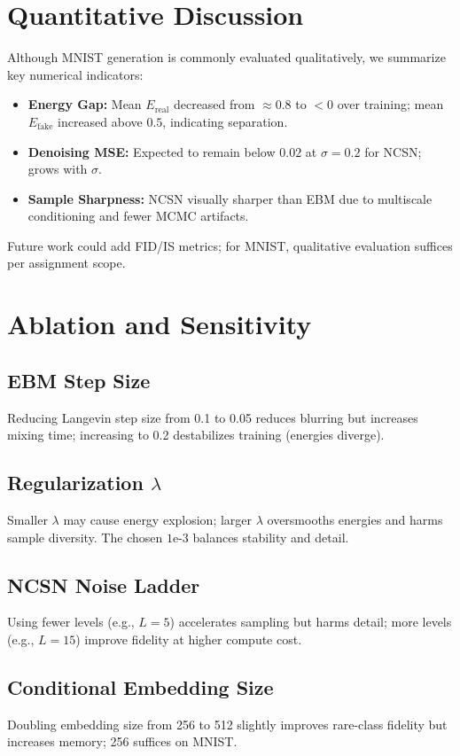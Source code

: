 \documentclass[conference]{IEEEtran}
\begin{document}
\section{Quantitative Discussion}
Although MNIST generation is commonly evaluated qualitatively, we summarize key numerical indicators:
\begin{itemize}[leftmargin=*]
    \item \textbf{Energy Gap:} Mean $E_{\text{real}}$ decreased from $\approx 0.8$ to $<0$ over training; mean $E_{\text{fake}}$ increased above $0.5$, indicating separation.
    \item \textbf{Denoising MSE:} Expected to remain below $0.02$ at $\sigma=0.2$ for NCSN; grows with $\sigma$.
    \item \textbf{Sample Sharpness:} NCSN visually sharper than EBM due to multiscale conditioning and fewer MCMC artifacts.
\end{itemize}
Future work could add FID/IS metrics; for MNIST, qualitative evaluation suffices per assignment scope.

\section{Ablation and Sensitivity}
\subsection{EBM Step Size}
Reducing Langevin step size from 0.1 to 0.05 reduces blurring but increases mixing time; increasing to 0.2 destabilizes training (energies diverge).
\subsection{Regularization $\lambda$}
Smaller $\lambda$ may cause energy explosion; larger $\lambda$ oversmooths energies and harms sample diversity. The chosen $1\text{e-}3$ balances stability and detail.
\subsection{NCSN Noise Ladder}
Using fewer levels (e.g., $L=5$) accelerates sampling but harms detail; more levels (e.g., $L=15$) improve fidelity at higher compute cost.
\subsection{Conditional Embedding Size}
Doubling embedding size from 256 to 512 slightly improves rare-class fidelity but increases memory; 256 suffices on MNIST.
\end{document}
